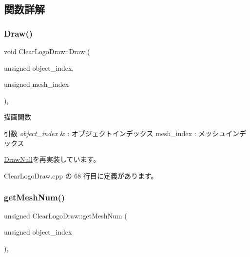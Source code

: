 \subsection{関数詳解}
\mbox{\label{class_clear_logo_draw_ab018f370071f370ae7016d8ee402c456}} 
\subsubsection{\texorpdfstring{Draw()}{Draw()}}
{\footnotesize\ttfamily void Clear\+Logo\+Draw\+::\+Draw (\begin{DoxyParamCaption}\item[{unsigned}]{object\+\_\+index,  }\item[{unsigned}]{mesh\+\_\+index }\end{DoxyParamCaption})\hspace{0.3cm}{\ttfamily [override]}, {\ttfamily [virtual]}}



描画関数 


\begin{DoxyParams}{引数}
{\em object\+\_\+index} & \+: オブジェクトインデックス mesh\+\_\+index \+: メッシュインデックス \\
\hline
\end{DoxyParams}


\mbox{\hyperlink{class_draw_null_a72ac0b7dc40b1469582419dcc5b0e114}{Draw\+Null}}を再実装しています。



 Clear\+Logo\+Draw.\+cpp の 68 行目に定義があります。

\mbox{\label{class_clear_logo_draw_a257f34e6f8325580f7df835f20d2ebb4}} 
\subsubsection{\texorpdfstring{get\+Mesh\+Num()}{getMeshNum()}}
{\footnotesize\ttfamily unsigned Clear\+Logo\+Draw\+::get\+Mesh\+Num (\begin{DoxyParamCaption}\item[{unsigned}]{object\+\_\+index }\end{DoxyParamCaption})\hspace{0.3cm}{\ttfamily [override]}, {\ttfamily [virtual]}}



